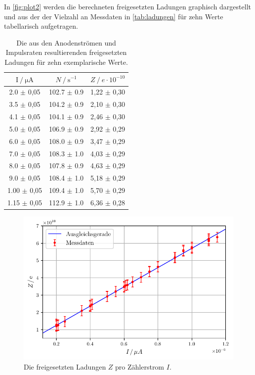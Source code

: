 In \autoref{fig:plot2} werden die berechneten freigesetzten Ladungen graphisch dargestellt und
aus der der Vielzahl an Messdaten in \autoref{tab:ladungen} für zehn Werte tabellarisch aufgetragen.
\begin{table}
    \centering
    \caption{Die aus den Anodenströmen und Impulsraten resultierenden freigesetzten Ladungen für zehn exemplarische Werte.}
    \label{tab:ladungen}
    \begin{tabular}{c c c}
        \toprule
        $\mathrm{I} \mathbin{/} \unit{\micro\ampere}$ &
        $N \mathbin{/} \mathrm{s^{-1}}$ &
        $Z \mathbin{/} e \cdot 10^{-10}$ \\
        \midrule
        2.0  $\pm$ 0,05 & 102.7 $\pm$ 0.9 & 1,22 $\pm$ 0,30 \\
        3.5  $\pm$ 0,05 & 104.2 $\pm$ 0.9 & 2,10 $\pm$ 0,30 \\
        4.1  $\pm$ 0,05 & 104.1 $\pm$ 0.9 & 2,46 $\pm$ 0,30 \\
        5.0  $\pm$ 0,05 & 106.9 $\pm$ 0.9 & 2,92 $\pm$ 0,29 \\
        6.0  $\pm$ 0,05 & 108.0 $\pm$ 0.9 & 3,47 $\pm$ 0,29 \\
        7.0  $\pm$ 0,05 & 108.3 $\pm$ 1.0 & 4,03 $\pm$ 0,29 \\
        8.0  $\pm$ 0,05 & 107.8 $\pm$ 0.9 & 4,63 $\pm$ 0,29 \\
        9.0  $\pm$ 0,05 & 108.4 $\pm$ 1.0 & 5,18 $\pm$ 0,29 \\
        1.00 $\pm$ 0,05 & 109.4 $\pm$ 1.0 & 5,70 $\pm$ 0,29 \\
        1.15 $\pm$ 0,05 & 112.9 $\pm$ 1.0 & 6,36 $\pm$ 0,28 \\
        \bottomrule
    \end{tabular}
\end{table}

\begin{figure}
    \centering
    \includegraphics[width = 0.9\linewidth]{build/plot2.pdf}
    \caption{Die freigesetzten Ladungen $Z$ pro Zählerstrom $I$.}
    \label{fig:plot2}
\end{figure}